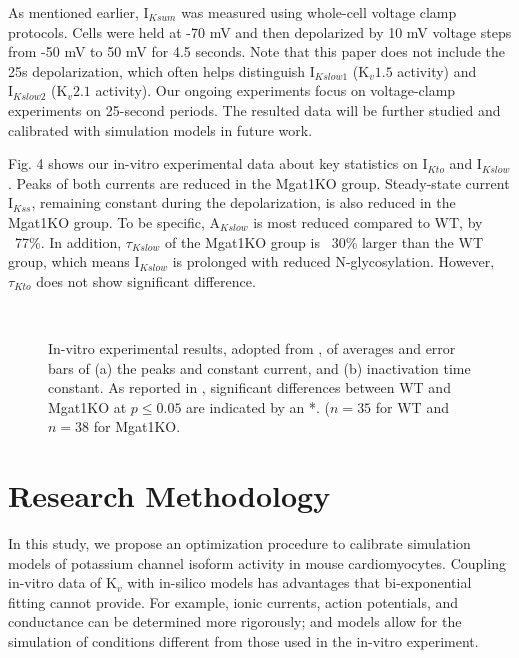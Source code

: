 \documentclass[journal]{IEEEtran}
\begin{document}
As mentioned earlier, $\text{I}_{Ksum}$ was measured using whole-cell voltage clamp protocols. Cells were held at -70 mV and then depolarized by 10 mV voltage steps from -50 mV to 50 mV for 4.5 seconds. Note that this paper does not include the 25s depolarization, which often helps distinguish $\text{I}_{Kslow1}$ ($\text{K}_{v}1.5$ activity) and $\text{I}_{Kslow2}$ ($\text{K}_{v}2.1$ activity). Our ongoing experiments focus on voltage-clamp experiments on 25-second periods. The resulted data will be further studied and calibrated with simulation models in future work.

Fig. 4 shows our in-vitro experimental data about key statistics on $\text{I}_{Kto}$ and $\text{I}_{Kslow}$. Peaks of both currents are reduced in the Mgat1KO group. Steady-state current $\text{I}_{Kss}$, remaining constant during the depolarization, is also reduced in the Mgat1KO group. To be specific, $\text{A}_{Kslow}$ is most reduced compared to WT, by ~77\%. In addition, $\tau_{Kslow}$ of the Mgat1KO group is ~30\% larger than the WT group, which means $\text{I}_{Kslow}$ is prolonged with reduced N-glycosylation. However, $\tau_{Kto}$ does not show significant difference.
\begin{figure}
    \label{fig4}
    \centering
    \\
    \caption{In-vitro experimental results, adopted from \cite{ednie2019reduced}, of averages and error bars of (a) the peaks and constant current, and (b) inactivation time constant. As reported in \cite{ednie2019reduced}, significant differences between WT and Mgat1KO at $p \leq 0.05$ are indicated by an *. ($n=35$ for WT and $n=38$ for Mgat1KO.}
\end{figure}

\section{Research Methodology}
In this study, we propose an optimization procedure to calibrate simulation models of potassium channel isoform activity in mouse cardiomyocytes. Coupling in-vitro data of $\text{K}_{v}$ with in-silico models has advantages that bi-exponential fitting cannot provide. For example, ionic currents, action potentials, and conductance can be determined more rigorously; and models allow for the simulation of conditions different from those used in the in-vitro experiment. 
\end{document}
